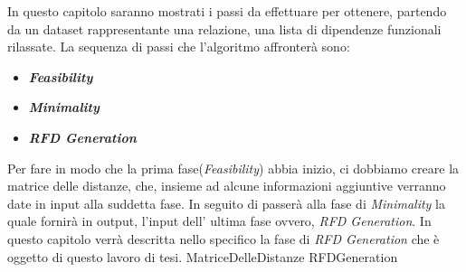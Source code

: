 In questo capitolo saranno mostrati i passi da effettuare per ottenere, partendo da un dataset rappresentante una relazione, una lista di dipendenze funzionali rilassate.
La sequenza di passi che l'algoritmo affronterà sono:
\begin{itemize}
	\item \textbf{\emph{Feasibility}}
	\item \textbf{\emph{Minimality}}
	\item \textbf{\emph{RFD Generation}}
\end{itemize}
Per fare in modo che la prima fase(\emph{Feasibility}) abbia inizio, ci dobbiamo creare la matrice delle distanze, che, insieme ad alcune informazioni aggiuntive verranno date in input alla suddetta fase.
In seguito di passerà alla fase di \textit{Minimality} la quale fornirà in output, l'input dell' ultima fase ovvero, \textit{RFD Generation}. In questo capitolo verrà descritta nello specifico la fase di \textit{RFD Generation} che è oggetto di questo lavoro di tesi.
{MatriceDelleDistanze}
{RFDGeneration}